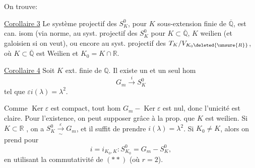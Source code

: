 
On trouve:

\uline{Corollaire 3} Le système projectif des $S_K^0$, pour $K$ sous-extension
finie de $\overline{\mathbb Q}$, est can. isom (via norme,
au syst. projectif des $S_K^0$ pour $K\subset\overline{\mathbb Q}$, $K$ weilien
(et galoisien si on veut), ou encore au syst. projectif des
 $T_K/V_{K_0\deleted{\unsure{R}}}$, où
$K\subset\overline{\mathbb Q}$ est Weilien et $K_0=K\cap\mathbb R$.

\uline{Corollaire 4} Soit $K$ ext. finie de $\mathbb Q$. Il existe un et un seul hom
\[
G_m\xrightarrow{i}S_K^0
\]
tel que $\varepsilon i(\lambda)=\lambda^2$.

Comme $\operatorname{Ker}\varepsilon$ est compact, tout hom
$G_m-\operatorname{Ker}\varepsilon$ est nul, donc l'unicité est claire.
Pour l'existence, on peut supposer grâce à la prop. que $K$ est weilien.
Si $K\subset\mathbb R$ , on a
$S_K^0\xrightarrow[\sim]{\varepsilon}G_m$, et il suffit de prendre $i(\lambda)=\lambda^2$.
Si $K_0\ne K$, alors on prend pour
\[
i=i_{K_0,K}:S_{K_0}^0=G_m-S_K^0,
\]
en utilisant la commutativité de $(**)$ (où $r=2$).
